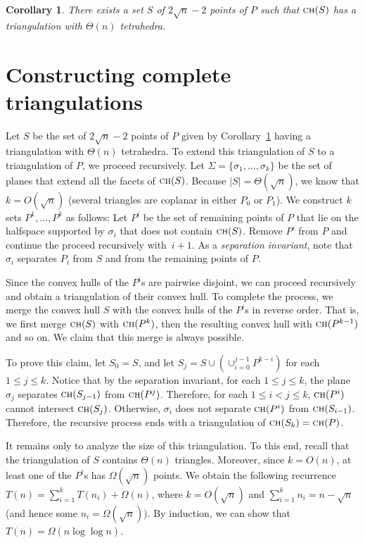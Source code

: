 \documentclass[a4paper, 11pt]{article}
\newtheorem{corollary}[theorem]{Corollary}
\newcommand{\ch}[1]{\ensuremath{\textsc{ch}(#1)}}
\begin{document}
\begin{corollary}\label{corollary:Existence of set}
There exists a set $S$ of $2\sqrt{n}-2$ points of $P$ such that $\ch{S}$ has a triangulation with $\Theta(n)$ tetrahedra.
\end{corollary}

\section{Constructing complete triangulations}
Let $S$ be the set of $2\sqrt{n}-2$ points of $P$ given by Corollary~\ref{corollary:Existence of set} having a triangulation with $\Theta(n)$ tetrahedra.
To extend this triangulation of $S$ to a triangulation of $P$, we proceed recursively. Let $\Sigma = \{\sigma_1, \ldots, \sigma_k\}$ be the set of planes that extend all the facets of $\ch{S}$. Because $|S| = \Theta(\sqrt{n})$, we know that $k =  O(\sqrt{n})$ (several triangles are coplanar in either $P_0$ or $P_1$).
We construct $k$ sets $P^1, \ldots ,P^k$ as follows: 
Let $P^i$ be the set of remaining points of $P$ that lie on the halfspace supported by $\sigma_i$ that does not contain $\ch{S}$.
Remove $P^i$ from $P$ and continue the proceed recursively with~$i+1$.
As a \emph{separation invariant}, note that $\sigma_i$ separates $P_i$ from $S$ and from the remaining points of $P$.

Since the convex hulls of the $P^i$s are pairwise disjoint, we can proceed recursively and obtain a triangulation of their convex hull. 
To complete the process, we merge the convex hull $S$ with the convex hulls of the $P^i$s in reverse order. 
That is, we first merge $\ch{S}$ with $\ch{P^k}$, then the resulting convex hull with $\ch{P^{k-1}}$ and so on. 
We claim that this merge is always possible. 

To prove this claim, let $S_0 = S$, and let $S_j = S\cup (\cup_{i=0}^{j -1} P^{k-i})$ for each $1\leq j\leq k$. 
Notice that by the separation invariant, for each $1\leq  j \leq k$, the plane $\sigma_j$ separates $\ch{S_{j-1}}$ from $\ch{P^j}$.
Therefore, for each $1\leq i < j \leq k$, $\ch{P^i}$ cannot intersect $\ch{S_j}$. Otherwise, $\sigma_i$ does not separate $\ch{P^i}$ from $\ch{S_{i-1}}$. Therefore, the recursive process ends with a triangulation of $\ch{S_k} = \ch{P}$.

It remains only to analyze the size of this triangulation. To this end, recall that the triangulation of $S$ contains $\Theta(n)$ triangles.
Moreover, since $k = O(n)$, at least one of the $P^i$s has $\Omega(\sqrt{n})$ points.
We obtain the following recurrence $T(n) = \sum_{i=1}^k T(n_i) + \Omega(n)$, where $k = O(\sqrt{n})$ and $\sum_{i=1}^k n_i = n-\sqrt{n}$ (and hence some $n_i = \Omega (\sqrt{n})$). 
By induction, we can show that $T(n) = \Omega(n\log\log n)$.
\end{document}

